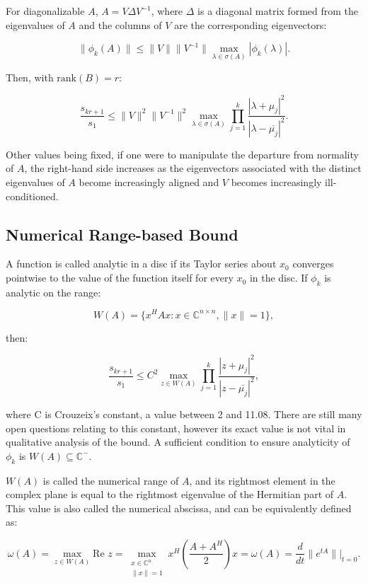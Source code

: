 \documentclass[12pt]{scrartcl}
\newcommand{\Cnn}{\mathbb{C}^{n \times n}}
\begin{document}
For diagonalizable $A$, $A=V \Delta V^{-1}$, where $\Delta$ is a diagonal matrix formed from the eigenvalues of $A$ and the columns of $V$ are the corresponding eigenvectors:

$$\| \phi_{k}(A) \| \leq \|V\| \|V^{-1}\| \max_{\lambda \in \sigma(A)} |\phi_{k}(\lambda)|.$$

Then, with $\text{rank}(B)=r$: 

$$\frac{s_{kr+1}}{s_{1}} \leq \|V \|^{2} \| V^{-1} \|^{2} \max_{\lambda \in \sigma (A)} \prod_{j=1}^{k} \frac{ | \lambda + \mu_j |^{2}}{| \lambda - \overline{\mu_{j}} |^{2}} .$$

Other values being fixed, if one were to manipulate the departure from normality of $A$, the right-hand side increases as the eigenvectors associated with the distinct eigenvalues of $A$ become increasingly aligned and $V$ becomes increasingly ill-conditioned.

\subsection{Numerical Range-based Bound}

A function is called analytic in a disc if its Taylor series about $x_{0}$ converges pointwise to the value of the function itself for every $x_{0}$ in the disc. If $\phi_{k}$ is analytic on the range:

$$W(A) = \{x^{H}Ax:x \in \Cnn , \| x \| = 1\}, $$

then:

$$\frac{s_{kr+1}}{s_{1}} \leq C^{2} \max_{z \in W(A)} \prod_{j=1}^{k} \frac{ | z + \mu_j |^{2}}{|z - \bar{\mu_{j}} |^{2}},$$

where C is Crouzeix's constant, a value between 2 and 11.08. There are still many open questions relating to this constant, however its exact value is not vital in qualitative analysis of the bound. A sufficient condition to ensure analyticity of $\phi_{k}$ is $W(A) \subseteq \mathbb{C}^{-}$.

$W(A)$ is called the numerical range of $A$, and its rightmost element in the complex plane is equal to the rightmost eigenvalue of the Hermitian part of $A$. This value is also called the numerical abscissa, and can be equivalently defined as: 

$$\omega(A) = \max_{z \in W(A)} \text{Re }z = \max_{\substack{x \in \mathbb{C}^{n} \\ \| x \| = 1}} x^{H} \left( \frac{A+A^{H}}{2} \right)x = \omega(A) = \frac{d}{dt} \| e^{tA} \| \rvert_{t=0} .$$
\end{document}
